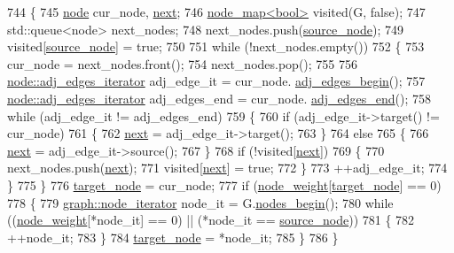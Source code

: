 \begin{DoxyCode}
744 \{
745     \mbox{\hyperlink{classnode}{node}} cur\_node, \mbox{\hyperlink{struct_g_m_l__pair_aef47e6103f05e1411fa55f731972b592}{next}};
746     \mbox{\hyperlink{classnode__map}{node\_map<bool>}} visited(G, \textcolor{keyword}{false});
747     std::queue<node> next\_nodes;
748     next\_nodes.push(\mbox{\hyperlink{classratio__cut__partition_abb18c3acafc590e258453d7a8d86bb49}{source\_node}});
749     visited[\mbox{\hyperlink{classratio__cut__partition_abb18c3acafc590e258453d7a8d86bb49}{source\_node}}] = \textcolor{keyword}{true};
750 
751     \textcolor{keywordflow}{while} (!next\_nodes.empty())
752     \{
753     cur\_node = next\_nodes.front();
754     next\_nodes.pop();
755 
756     \mbox{\hyperlink{classnode_a12cb1a2167f5f03c054de5e707d3156f}{node::adj\_edges\_iterator}} adj\_edge\_it = cur\_node.
      \mbox{\hyperlink{classnode_a788d3e932a5c164caa5ec82aa47551b2}{adj\_edges\_begin}}();
757     \mbox{\hyperlink{classnode_a12cb1a2167f5f03c054de5e707d3156f}{node::adj\_edges\_iterator}} adj\_edges\_end = cur\_node.
      \mbox{\hyperlink{classnode_aa1e7887d29390297580769454f769ad6}{adj\_edges\_end}}();
758     \textcolor{keywordflow}{while} (adj\_edge\_it != adj\_edges\_end)
759     \{
760         \textcolor{keywordflow}{if} (adj\_edge\_it->target() != cur\_node)
761         \{
762         \mbox{\hyperlink{struct_g_m_l__pair_aef47e6103f05e1411fa55f731972b592}{next}} = adj\_edge\_it->target();
763         \}
764         \textcolor{keywordflow}{else}
765         \{
766         \mbox{\hyperlink{struct_g_m_l__pair_aef47e6103f05e1411fa55f731972b592}{next}} = adj\_edge\_it->source();
767         \}
768         \textcolor{keywordflow}{if} (!visited[\mbox{\hyperlink{struct_g_m_l__pair_aef47e6103f05e1411fa55f731972b592}{next}}])
769         \{
770         next\_nodes.push(\mbox{\hyperlink{struct_g_m_l__pair_aef47e6103f05e1411fa55f731972b592}{next}});
771         visited[\mbox{\hyperlink{struct_g_m_l__pair_aef47e6103f05e1411fa55f731972b592}{next}}] = \textcolor{keyword}{true};
772         \}
773         ++adj\_edge\_it;
774     \}
775     \}
776     \mbox{\hyperlink{classratio__cut__partition_a343ba76869e64141fb795010e388744b}{target\_node}} = cur\_node;
777     \textcolor{keywordflow}{if} (\mbox{\hyperlink{classratio__cut__partition_a4d9d2a9317a062f839ea7155c37b173f}{node\_weight}}[\mbox{\hyperlink{classratio__cut__partition_a343ba76869e64141fb795010e388744b}{target\_node}}] == 0)
778     \{
779     \mbox{\hyperlink{classgraph_a2cb374b84c133ce13f94e73c3e5da7fa}{graph::node\_iterator}} node\_it = G.\mbox{\hyperlink{classgraph_aec053a4b509d1be804237a80044c54c0}{nodes\_begin}}();
780     \textcolor{keywordflow}{while} ((\mbox{\hyperlink{classratio__cut__partition_a4d9d2a9317a062f839ea7155c37b173f}{node\_weight}}[*node\_it] == 0) || (*node\_it == \mbox{\hyperlink{classratio__cut__partition_abb18c3acafc590e258453d7a8d86bb49}{source\_node}}))
781     \{
782         ++node\_it;
783     \}
784     \mbox{\hyperlink{classratio__cut__partition_a343ba76869e64141fb795010e388744b}{target\_node}} = *node\_it;
785     \}
786 \}
\end{DoxyCode}
